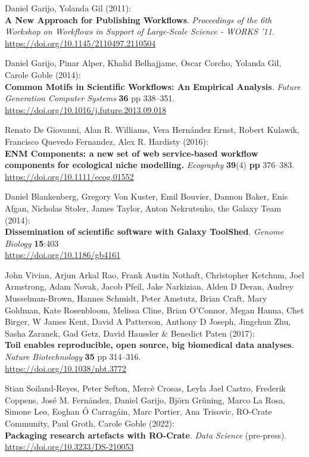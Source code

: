 \begin{thebibliography}{9}
 Daniel Garijo, Yolanda Gil (2011):\\
\textbf{A New Approach for Publishing Workflows}. \emph{Proceedings of
the 6th Workshop on Workflows in Support of Large-Scale Science - WORKS
'11}.\\
\url{https://doi.org/10.1145/2110497.2110504}

 Daniel Garijo, Pinar Alper, Khalid Belhajjame, Oscar Corcho,
Yolanda Gil, Carole Goble (2014):\\
\textbf{Common Motifs in Scientific Workflows: An Empirical Analysis}.
\emph{Future Generation Computer Systems} \textbf{36} pp 338--351.\\
\url{https://doi.org/10.1016/j.future.2013.09.018}

 Renato De Giovanni, Alan R. Williams, Vera Hernández Ernst,
Robert Kulawik, Francisco Quevedo Fernandez, Alex R. Hardisty (2016):\\
\textbf{ENM Components: a new set of web service‐based workflow
components for ecological niche modelling.} \emph{Ecography}
\textbf{39}(4) \textbf{pp} 376--383.\\
\url{https://doi.org/10.1111/ecog.01552}

 Daniel Blankenberg, Gregory Von Kuster, Emil Bouvier, Dannon
Baker, Enis Afgan, Nicholas Stoler, James Taylor, Anton Nekrutenko, the
Galaxy Team (2014):\\
\textbf{Dissemination of scientific software with Galaxy ToolShed}.
\emph{Genome Biology} \textbf{15}:403\\
\url{https://doi.org/10.1186/gb4161}

 John Vivian, Arjun Arkal Rao, Frank Austin Nothaft, Christopher
Ketchum, Joel Armstrong, Adam Novak, Jacob Pfeil, Jake Narkizian, Alden
D Deran, Audrey Musselman-Brown, Hannes Schmidt, Peter Amstutz, Brian
Craft, Mary Goldman, Kate Rosenbloom, Melissa Cline, Brian O'Connor,
Megan Hanna, Chet Birger, W James Kent, David A Patterson, Anthony D
Joseph, Jingchun Zhu, Sasha Zaranek, Gad Getz, David Haussler \&
Benedict Paten (2017):\\
\textbf{Toil enables reproducible, open source, big biomedical data
analyses}. \emph{Nature Biotechnology} \textbf{35} pp 314--316.\\
\url{https://doi.org/10.1038/nbt.3772}

 Stian Soiland-Reyes, Peter Sefton, Mercè Crosas, Leyla Jael
Castro, Frederik Coppens, José M. Fernández, Daniel Garijo, Björn
Grüning, Marco La Rosa, Simone Leo, Eoghan Ó Carragáin, Marc Portier,
Ana Trisovic, RO-Crate Community, Paul Groth, Carole Goble (2022):\\
\textbf{Packaging research artefacts with RO-Crate}. \emph{Data Science}
(pre-press).\\
\url{https://doi.org/10.3233/DS-210053}


\end{thebibliography}
